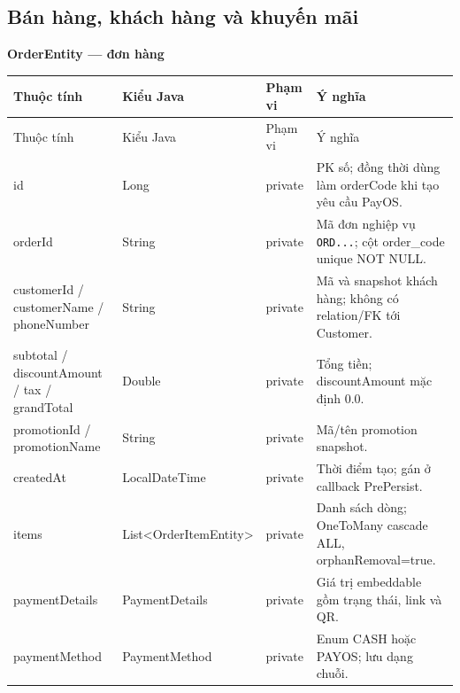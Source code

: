 \documentclass[12pt,a4paper,oneside]{report}
\newcommand{\ClassTableTitle}[1]{\par\medskip\noindent\textbf{#1}\par\smallskip}
\begin{document}
\subsection{Bán hàng, khách hàng và khuyến mãi}
\ClassTableTitle{OrderEntity — đơn hàng}
\small\begin{longtable}{@{}D{3.25cm}D{3.35cm}D{1.35cm}D{6.75cm}@{}}\toprule Thuộc tính & Kiểu Java & Phạm vi & Ý nghĩa\\\midrule\endfirsthead\toprule Thuộc tính & Kiểu Java & Phạm vi & Ý nghĩa\\\midrule\endhead\bottomrule\endfoot
id & Long & private & PK số; đồng thời dùng làm orderCode khi tạo yêu cầu PayOS.\\orderId & String & private & Mã đơn nghiệp vụ \texttt{ORD...}; cột order\_code unique NOT NULL.\\customerId / customerName / phoneNumber & String & private & Mã và snapshot khách hàng; không có relation/FK tới Customer.\allowbreak \\subtotal / discountAmount / tax / grandTotal & Double & private & Tổng tiền; discountAmount mặc định 0.0.\\promotionId / promotionName & String & private & Mã/tên promotion snapshot.\\createdAt & LocalDateTime & private & Thời điểm tạo; gán ở callback PrePersist.\\items & List\textless OrderItemEntity\textgreater & private & Danh sách dòng; OneToMany cascade ALL, orphanRemoval=true.\\paymentDetails & PaymentDetails & private & Giá trị embeddable gồm trạng thái, link và QR.\\paymentMethod & PaymentMethod & private & Enum CASH hoặc PAYOS; lưu dạng chuỗi.\\\end{longtable}\normalsize
\end{document}
